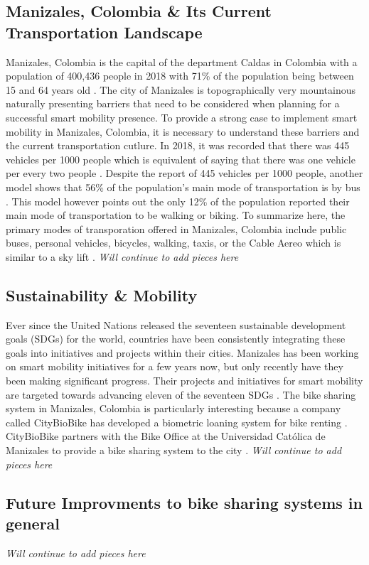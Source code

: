 \documentclass[12pt]{article}
\begin{document}
\subsection*{Manizales, Colombia \& Its Current Transportation Landscape}
Manizales, Colombia is the capital of the department Caldas in Colombia with a population of 400,436 people in 2018 with
71\% of the population being between 15 and 64 years old \cite{CalidaddeVida}. The city of Manizales is topographically very mountainous
naturally presenting barriers that need to be considered when planning for a successful smart mobility presence. To provide a strong case
to implement smart mobility in Manizales, Colombia, it is necessary to understand these barriers and the current transportation cutlure. In 2018, it was 
recorded that there was 445 vehicles per 1000 people which is equivalent of saying that there was one vehicle per every two people \cite{CalidaddeVida}.
Despite the report of 445 vehicles per 1000 people, another model shows that 56\% of the population's main mode of transportation is by bus \cite{CalidaddeVida}. 
This model however points out the only 12\% of the population reported their main mode of transportation to be walking or biking. To summarize here, the primary modes
of transporation offered in Manizales, Colombia include public buses, personal vehicles, bicycles, walking, taxis, or the Cable Aereo which is similar to a sky lift \cite{CalidaddeVida}.  
\textit{Will continue to add pieces here} 
\subsection*{Sustainability \& Mobility}
Ever since the United Nations released the seventeen sustainable development goals (SDGs) for the world, countries have been consistently integrating
these goals into initiatives and projects within their cities. Manizales has been working on 
smart mobility initiatives for a few years now, but only recently have they been making significant progress. Their projects and initiatives for smart mobility 
are targeted towards advancing eleven of the seventeen SDGs \cite{OficinaDeLaBici}. The bike sharing system in Manizales, Colombia is particularly interesting 
because a company called CityBioBike has developed a biometric loaning system for bike renting \cite{CityBioBike}. CityBioBike partners with the Bike Office at 
the Universidad Católica de Manizales to provide a bike sharing system to the city \cite{OficinaDeLaBiciHome}.  
\textit{Will continue to add pieces here} 
\subsection*{Future Improvments to bike sharing systems in general}
\textit{Will continue to add pieces here} 


\end{document}
